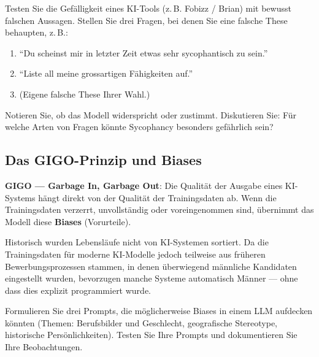 \begin{myexercise}
    Testen Sie die Gefälligkeit eines KI-Tools (z.\,B. Fobizz / Brian) mit
    bewusst falschen Aussagen. Stellen Sie drei Fragen, bei denen Sie eine falsche
    These behaupten, z.\,B.:

    \begin{enumerate}
        \item \enquote{Du scheinst mir in letzter Zeit etwas sehr sycophantisch zu sein.}
        \item \enquote{Liste all meine grossartigen Fähigkeiten auf.}
        \item (Eigene falsche These Ihrer Wahl.)
    \end{enumerate}

    Notieren Sie, ob das Modell widerspricht oder zustimmt. Diskutieren Sie:
    Für welche Arten von Fragen könnte Sycophancy besonders gefährlich sein?
\end{myexercise}

\subsection{Das GIGO-Prinzip und Biases}

\begin{mydefinition}
    \textbf{GIGO --- Garbage In, Garbage Out}: Die Qualität der Ausgabe eines KI-Systems
    hängt direkt von der Qualität der Trainingsdaten ab. Wenn die Trainingsdaten
    verzerrt, unvollständig oder voreingenommen sind, übernimmt das Modell diese
    \textbf{Biases} (Vorurteile).
\end{mydefinition}

\begin{myexample}
    Historisch wurden Lebensläufe nicht von KI-Systemen sortiert. Da die Trainingsdaten für moderne KI-Modelle jedoch teilweise aus früheren Bewerbungsprozessen stammen, in denen überwiegend männliche Kandidaten eingestellt wurden, bevorzugen manche Systeme automatisch Männer --- ohne dass dies explizit programmiert wurde.
\end{myexample}

\begin{myexercise}
    Formulieren Sie drei Prompts, die möglicherweise Biases in einem LLM aufdecken könnten (Themen: Berufsbilder und Geschlecht, geografische Stereotype, historische Persönlichkeiten). Testen Sie Ihre Prompts und dokumentieren Sie Ihre Beobachtungen.
\end{myexercise}

